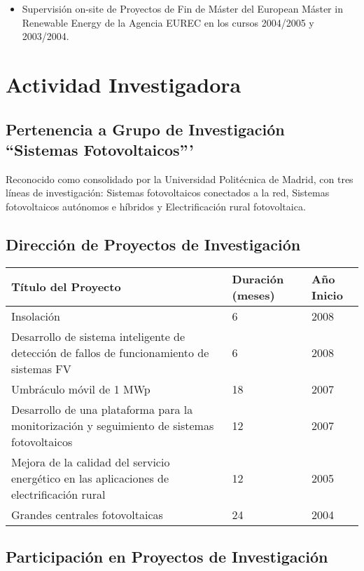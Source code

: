 \documentclass[article, a4paper]{memoir}
\begin{document}
\begin{itemize}
\item Supervisión on-site de Proyectos de Fin de Máster del European Máster in Renewable Energy de la Agencia EUREC en los cursos 2004/2005 y 2003/2004.
\end{itemize}


\section{Actividad Investigadora}
\label{sec-4}

\subsection{Pertenencia a Grupo de Investigación ``Sistemas Fotovoltaicos'''}
\label{sec-4-1}

Reconocido como consolidado por la Universidad Politécnica de
Madrid, con tres líneas de investigación: Sistemas fotovoltaicos
conectados a la red, Sistemas fotovoltaicos autónomos e híbridos y
Electrificación rural fotovoltaica.


\subsection{Dirección de Proyectos de Investigación}
\label{sec-4-2}
\begin{center}
\begin{tabular}{p{110mm}|p{17mm}|p{25mm}}
Título del Proyecto & Duración (meses) & Año Inicio\\
\hline
Insolación & 6 & 2008\\
Desarrollo de sistema inteligente de detección de fallos de funcionamiento de sistemas FV & 6 & 2008\\
Umbráculo móvil de 1 MWp & 18 & 2007\\
Desarrollo de una plataforma para la monitorización y seguimiento de sistemas fotovoltaicos & 12 & 2007\\
Mejora de la calidad del servicio energético en las aplicaciones de electrificación rural & 12 & 2005\\
Grandes centrales fotovoltaicas & 24 & 2004\\
\end{tabular}
\end{center}


\subsection{Participación en Proyectos de Investigación}
\label{sec-4-3}
\end{document}
